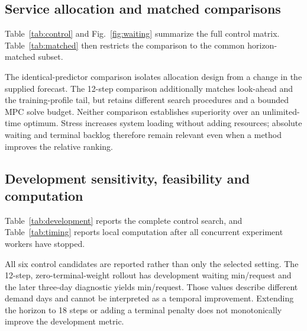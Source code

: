 \subsection{Service allocation and matched comparisons}
Table~\ref{tab:control} and Fig.~\ref{fig:waiting} summarize the full control matrix. Table~\ref{tab:matched} then restricts the comparison to the common horizon-matched subset.



\ControlInterpretation\par





\MatchedInterpretation\par

The identical-predictor comparison isolates allocation design from a change in the supplied forecast. The 12-step comparison additionally matches look-ahead and the training-profile tail, but retains different search procedures and a bounded MPC solve budget. Neither comparison establishes superiority over an unlimited-time optimum. Stress increases system loading without adding resources; absolute waiting and terminal backlog therefore remain relevant even when a method improves the relative ranking.
\FloatBarrier

\subsection{Development sensitivity, feasibility and computation}
Table~\ref{tab:development} reports the complete control search, and Table~\ref{tab:timing} reports local computation after all concurrent experiment workers have stopped.



All six control candidates are reported rather than only the selected setting. The 12-step, zero-terminal-weight rollout has development waiting \DevelopmentWait{} min/request and the later three-day diagnostic yields \ConfirmationWait{} min/request. Those values describe different demand days and cannot be interpreted as a temporal improvement. Extending the horizon to 18 steps or adding a terminal penalty does not monotonically improve the development metric.

\AuditInterpretation\par



